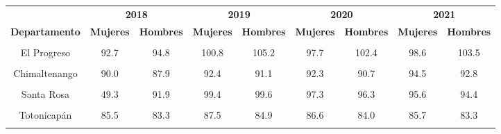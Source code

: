 \begin{tabular}[t]{ccccccccc}
\toprule
\multicolumn{1}{c}{\textbf{ }} & \multicolumn{2}{c}{\textbf{2018}} & \multicolumn{2}{c}{\textbf{2019}} & \multicolumn{2}{c}{\textbf{2020}} & \multicolumn{2}{c}{\textbf{2021}} \\
\cmidrule(l{3pt}r{3pt}){2-3} \cmidrule(l{3pt}r{3pt}){4-5} \cmidrule(l{3pt}r{3pt}){6-7} \cmidrule(l{3pt}r{3pt}){8-9}
\textbf{Departamento} & \textbf{Mujeres} & \textbf{Hombres} & \textbf{Mujeres} & \textbf{Hombres} & \textbf{Mujeres} & \textbf{Hombres} & \textbf{Mujeres} & \textbf{Hombres}\\
\midrule
\cellcolor[HTML]{B6B3FF}{Guatemala} & \cellcolor[HTML]{B6B3FF}{100.1} & \cellcolor[HTML]{B6B3FF}{99.2} & \cellcolor[HTML]{B6B3FF}{106.4} & \cellcolor[HTML]{B6B3FF}{105.6} & \cellcolor[HTML]{B6B3FF}{104.0} & \cellcolor[HTML]{B6B3FF}{103.0} & \cellcolor[HTML]{B6B3FF}{100.8} & \cellcolor[HTML]{B6B3FF}{99.5}\\
El Progreso & 92.7 & 94.8 & 100.8 & 105.2 & 97.7 & 102.4 & 98.6 & 103.5\\
\cellcolor[HTML]{B6B3FF}{Sacatepéquez} & \cellcolor[HTML]{B6B3FF}{94.8} & \cellcolor[HTML]{B6B3FF}{93.9} & \cellcolor[HTML]{B6B3FF}{99.6} & \cellcolor[HTML]{B6B3FF}{99.3} & \cellcolor[HTML]{B6B3FF}{98.7} & \cellcolor[HTML]{B6B3FF}{98.4} & \cellcolor[HTML]{B6B3FF}{97.2} & \cellcolor[HTML]{B6B3FF}{96.5}\\
Chimaltenango & 90.0 & 87.9 & 92.4 & 91.1 & 92.3 & 90.7 & 94.5 & 92.8\\
\cellcolor[HTML]{B6B3FF}{Escuintla} & \cellcolor[HTML]{B6B3FF}{90.9} & \cellcolor[HTML]{B6B3FF}{94.1} & \cellcolor[HTML]{B6B3FF}{102.4} & \cellcolor[HTML]{B6B3FF}{105.5} & \cellcolor[HTML]{B6B3FF}{99.7} & \cellcolor[HTML]{B6B3FF}{102.4} & \cellcolor[HTML]{B6B3FF}{98.7} & \cellcolor[HTML]{B6B3FF}{100.7}\\
Santa Rosa & 49.3 & 91.9 & 99.4 & 99.6 & 97.3 & 96.3 & 95.6 & 94.4\\
\cellcolor[HTML]{B6B3FF}{Sololá} & \cellcolor[HTML]{B6B3FF}{88.7} & \cellcolor[HTML]{B6B3FF}{88.9} & \cellcolor[HTML]{B6B3FF}{94.0} & \cellcolor[HTML]{B6B3FF}{93.6} & \cellcolor[HTML]{B6B3FF}{94.4} & \cellcolor[HTML]{B6B3FF}{94.1} & \cellcolor[HTML]{B6B3FF}{96.0} & \cellcolor[HTML]{B6B3FF}{94.5}\\
Totonicapán & 85.5 & 83.3 & 87.5 & 84.9 & 86.6 & 84.0 & 85.7 & 83.3\\
\cellcolor[HTML]{B6B3FF}{Quetzaltenango} & \cellcolor[HTML]{B6B3FF}{90.6} & \cellcolor[HTML]{B6B3FF}{92.3} & \cellcolor[HTML]{B6B3FF}{96.6} & \cellcolor[HTML]{B6B3FF}{97.8} & \cellcolor[HTML]{B6B3FF}{95.9} & \cellcolor[HTML]{B6B3FF}{96.5} & \cellcolor[HTML]{B6B3FF}{94.2} & \cellcolor[HTML]{B6B3FF}{94.0}\\

\end{tabular}
